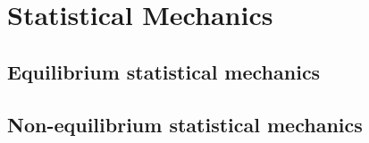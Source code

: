 \documentclass[../QFT_main.tex]{subfiles}
\begin{document}
\chapter{Statistical Mechanics}\label{ch:statistical_mechanics}


\section{Equilibrium statistical mechanics}



\section{Non-equilibrium statistical mechanics}
\end{document}
